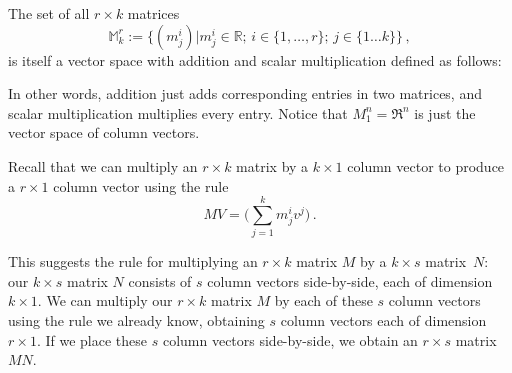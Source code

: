 The set of all $r\times k$ matrices 
\[{\mathbb M}_k^r:=\{(m^i_j)|m^i_j\in {\mathbb R};\,  
i\in \{1,\dots,r\} ;\, 
j\in \{1\dots k\} \}\, ,\] 
is itself  a vector space with  addition and scalar multiplication defined as follows:


In other words, addition just adds corresponding entries in two matrices, and scalar multiplication multiplies every entry.
Notice that $M_1^n = \Re^n$ is just the vector space of column vectors.

Recall that we can multiply an \(r \times k\) matrix by a \(k \times 1\) column vector to produce a \(r \times 1\) column vector using the rule
\[MV = \big(\sum_{j=1}^k m_j^i v^j\big)\, .\]

This suggests the rule for multiplying an \(r \times k\) matrix \(M\) by a \(k \times s\) matrix~\(N\): our \(k \times s\) matrix \(N\) consists of \(s\) column vectors side-by-side, each of dimension \(k \times 1.\) We can multiply our \(r \times k\) matrix \(M\) by each of these \(s\) column vectors using the rule we already know, obtaining \(s\) column vectors each of dimension \(r \times 1.\) If we place these \(s\) column vectors side-by-side, we obtain an \(r \times s\) matrix \(MN.\)

